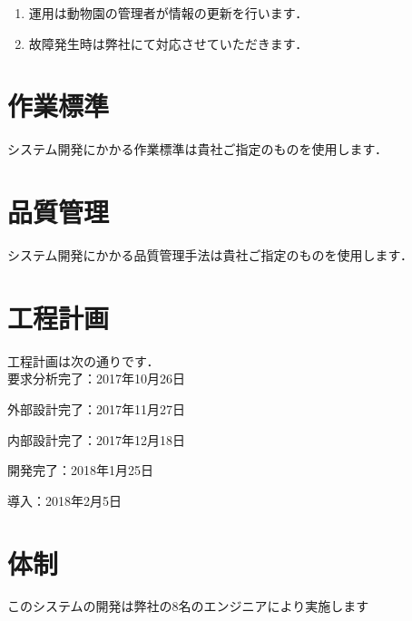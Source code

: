 \documentclass[a4j]{jarticle}
\begin{document}
\begin{enumerate}
	\item 運用は動物園の管理者が情報の更新を行います．
	\item 故障発生時は弊社にて対応させていただきます．
\end{enumerate}

\section{作業標準}
システム開発にかかる作業標準は貴社ご指定のものを使用します．

\section{品質管理}
システム開発にかかる品質管理手法は貴社ご指定のものを使用します．

\section{工程計画}
工程計画は次の通りです．\\

要求分析完了：2017年10月26日

外部設計完了：2017年11月27日

内部設計完了：2017年12月18日

開発完了：2018年1月25日

導入：2018年2月5日

\section{体制}
このシステムの開発は弊社の8名のエンジニアにより実施します
\end{document}
